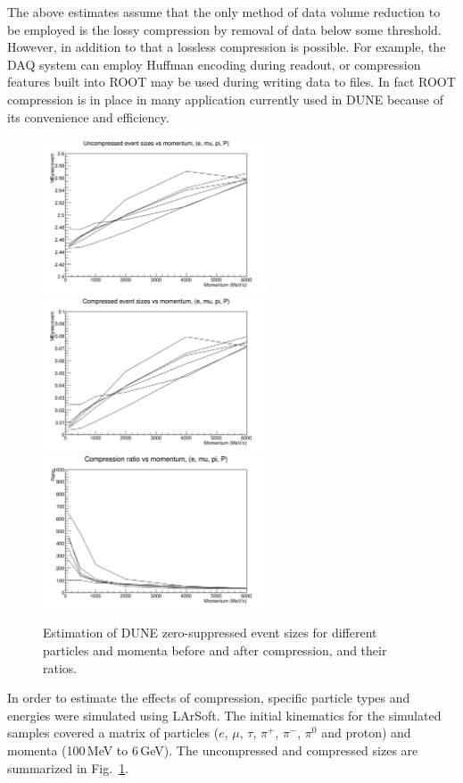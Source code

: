 The above estimates assume that the only method of data volume reduction to be employed is the
lossy compression by removal of data below some threshold.
However, in addition to that
a lossless compression is possible. For example, the DAQ system can employ Huffman encoding
during readout, or compression features built into ROOT may be used during writing data to files.
In fact ROOT compression is in place in many application currently used in DUNE because of its
convenience and efficiency.
\begin{figure}
[h!]
	\centering
	\includegraphics[width=0.6\textwidth]{btot.png}
	\includegraphics[width=0.6\textwidth]{bzip.png}
	\includegraphics[width=0.6\textwidth]{brat.png}
	\caption{Estimation of DUNE zero-suppressed event sizes for different particles and momenta before and after compression, and their ratios.}
	\label{fig:data-compression}
\end{figure}
In order to estimate the effects of compression, specific particle types and energies were simulated using LArSoft.
The initial kinematics for the simulated samples covered a matrix of
particles ($e$, $\mu$, $\tau$, $\pi^+$, $\pi^-$, $\pi^0$ and proton) and momenta
(100\,MeV to 6\,GeV). The uncompressed and compressed sizes are summarized in Fig.~\ref{fig:data-compression}.

